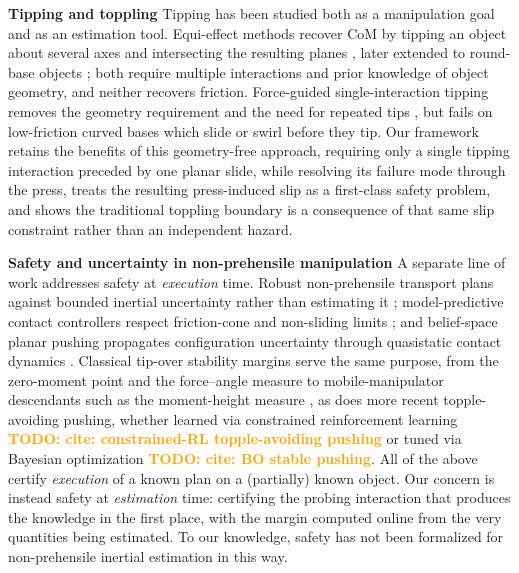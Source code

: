 \documentclass[10pt, conference]{IEEEtran}
\newcommand{\todo}[1]{\textcolor{orange}{\textbf{TODO: #1}}}
\begin{document}
\noindent \textbf{Tipping and toppling} Tipping has been studied both as a manipulation goal and as an estimation tool. Equi-effect methods recover CoM by tipping an object about several axes and intersecting the resulting planes \cite{yong_yu_estimation_1999}, later extended to round-base objects \cite{yong_yu_estimation_2001}; both require multiple interactions and prior knowledge of object geometry, and neither recovers friction. Force-guided single-interaction tipping removes the geometry requirement and the need for repeated tips \cite{hyland_arxiv_tipping}, but fails on low-friction curved bases which slide or swirl before they tip. Our framework retains the benefits of this geometry-free approach, requiring only a single tipping interaction preceded by one planar slide, while resolving its failure mode through the press, treats the resulting press-induced slip as a first-class safety problem, and shows the traditional toppling boundary is a consequence of that same slip constraint rather than an independent hazard.

\noindent \textbf{Safety and uncertainty in non-prehensile manipulation} A separate line of work addresses safety at \emph{execution} time. Robust non-prehensile transport plans against bounded inertial uncertainty rather than estimating it \cite{heins_robust_2025}; model-predictive contact controllers respect friction-cone and non-sliding limits \cite{selvaggio_non-prehensile_2023, heins_keep_2023}; and belief-space planar pushing propagates configuration uncertainty through quasistatic contact dynamics \cite{jankowski_robust_2025}. Classical tip-over stability margins serve the same purpose, from the zero-moment point and the force--angle measure \cite{papadopoulos_rey_1996} to mobile-manipulator descendants such as the moment-height measure \cite{moosavian_alipour_2006}, as does more recent topple-avoiding pushing, whether learned via constrained reinforcement learning \todo{cite: constrained-RL topple-avoiding pushing} or tuned via Bayesian optimization \todo{cite: BO stable pushing}. All of the above certify \emph{execution} of a known plan on a (partially) known object. Our concern is instead safety at \emph{estimation} time: certifying the probing interaction that produces the knowledge in the first place, with the margin computed online from the very quantities being estimated. To our knowledge, safety has not been formalized for non-prehensile inertial estimation in this way.
\end{document}

